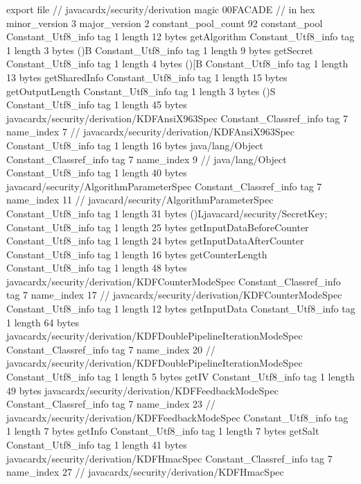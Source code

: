 export file {		// javacardx/security/derivation
	magic	00FACADE		 // in hex
	minor_version	3
	major_version	2
	constant_pool_count	92
	constant_pool {
		Constant_Utf8_info {
			tag	1
			length	12
			bytes	getAlgorithm
		}
		Constant_Utf8_info {
			tag	1
			length	3
			bytes	()B
		}
		Constant_Utf8_info {
			tag	1
			length	9
			bytes	getSecret
		}
		Constant_Utf8_info {
			tag	1
			length	4
			bytes	()[B
		}
		Constant_Utf8_info {
			tag	1
			length	13
			bytes	getSharedInfo
		}
		Constant_Utf8_info {
			tag	1
			length	15
			bytes	getOutputLength
		}
		Constant_Utf8_info {
			tag	1
			length	3
			bytes	()S
		}
		Constant_Utf8_info {
			tag	1
			length	45
			bytes	javacardx/security/derivation/KDFAnsiX963Spec
		}
		Constant_Classref_info {
			tag	7
			name_index	7		// javacardx/security/derivation/KDFAnsiX963Spec
		}
		Constant_Utf8_info {
			tag	1
			length	16
			bytes	java/lang/Object
		}
		Constant_Classref_info {
			tag	7
			name_index	9		// java/lang/Object
		}
		Constant_Utf8_info {
			tag	1
			length	40
			bytes	javacard/security/AlgorithmParameterSpec
		}
		Constant_Classref_info {
			tag	7
			name_index	11		// javacard/security/AlgorithmParameterSpec
		}
		Constant_Utf8_info {
			tag	1
			length	31
			bytes	()Ljavacard/security/SecretKey;
		}
		Constant_Utf8_info {
			tag	1
			length	25
			bytes	getInputDataBeforeCounter
		}
		Constant_Utf8_info {
			tag	1
			length	24
			bytes	getInputDataAfterCounter
		}
		Constant_Utf8_info {
			tag	1
			length	16
			bytes	getCounterLength
		}
		Constant_Utf8_info {
			tag	1
			length	48
			bytes	javacardx/security/derivation/KDFCounterModeSpec
		}
		Constant_Classref_info {
			tag	7
			name_index	17		// javacardx/security/derivation/KDFCounterModeSpec
		}
		Constant_Utf8_info {
			tag	1
			length	12
			bytes	getInputData
		}
		Constant_Utf8_info {
			tag	1
			length	64
			bytes	javacardx/security/derivation/KDFDoublePipelineIterationModeSpec
		}
		Constant_Classref_info {
			tag	7
			name_index	20		// javacardx/security/derivation/KDFDoublePipelineIterationModeSpec
		}
		Constant_Utf8_info {
			tag	1
			length	5
			bytes	getIV
		}
		Constant_Utf8_info {
			tag	1
			length	49
			bytes	javacardx/security/derivation/KDFFeedbackModeSpec
		}
		Constant_Classref_info {
			tag	7
			name_index	23		// javacardx/security/derivation/KDFFeedbackModeSpec
		}
		Constant_Utf8_info {
			tag	1
			length	7
			bytes	getInfo
		}
		Constant_Utf8_info {
			tag	1
			length	7
			bytes	getSalt
		}
		Constant_Utf8_info {
			tag	1
			length	41
			bytes	javacardx/security/derivation/KDFHmacSpec
		}
		Constant_Classref_info {
			tag	7
			name_index	27		// javacardx/security/derivation/KDFHmacSpec
}}}
